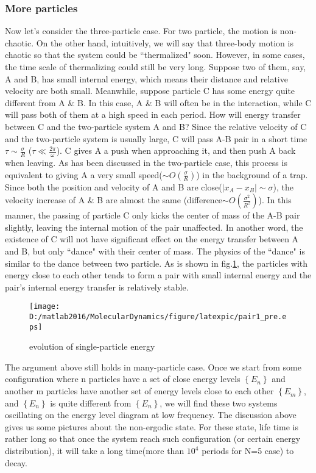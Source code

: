 \documentclass[aps,pre,twocolumn
,groupedaddress]{revtex4-1}
\begin{document}
\subsubsection{More particles}
Now let's consider the three-particle case. For two particle, the motion is non-chaotic. On the other hand, intuitively, we will say that three-body motion is chaotic so that the system could be ``thermalized" soon. However, in some cases, the time scale of thermalizing could still be very long. Suppose two of them, say, A and B, has small internal energy, which means their distance and relative velocity are both small. Meanwhile, suppose particle C has some energy quite different from A \& B. In this case, A \& B will often be in the interaction, while C will pass both of them at a high speed in each period. How will energy transfer between C and the two-particle system A and B? Since the relative velocity of C and the two-particle system is usually large, C will pass A-B pair in a short time $\tau\sim\frac{\sigma}{R}$ ($\tau\ll\frac{2\pi}{\omega}$). C gives A a push when approaching it, and then push A back when leaving.  As has been discussed in the two-particle case, this process is equivalent to giving A a very small speed($\sim O(\frac{\sigma}{R})$) in the background of a trap. Since both the position and velocity of A and B are close($|x_A-x_B|\sim\sigma$), the velocity increase of A \& B are almost the same (difference$\sim O(\frac{\sigma^2}{R^2})$). In this manner, the passing of particle C only kicks the center of mass of the A-B pair slightly, leaving the internal motion of the pair unaffected. In another word, the existence of C will not have significant effect on the energy transfer between A and B, but only ``dance" with their center of mass. The physics of the ``dance" is similar to the dance between two particle. As is shown in fig.\ref{fig:thermalization4}, the particles with energy close to each other tends to form a pair with small internal energy and the pair's internal energy transfer is relatively stable.

\begin{figure}
\centering
\texttt{[image: D:/matlab2016/MolecularDynamics/figure/latexpic/pair1\_pre.eps]}
\caption{evolution of single-particle energy}
\label{fig:thermalization4}
\end{figure}

The argument above still holds in many-particle case. Once we start from some configuration where n particles have a set of close energy levels $\left\lbrace E_n\right\rbrace $ and another m particles have another set of energy levels close to each other $\left\lbrace E_m\right\rbrace $, and $\left\lbrace E_n\right\rbrace $ is quite different from $\left\lbrace E_n\right\rbrace $, we will find these two systems oscillating on the energy level diagram at low frequency. 
The discussion above gives us some pictures about the non-ergodic state. For these state, life time is rather long so that once the system reach such configuration (or certain energy distribution), it will take a long time(more than $10^4$ periods for N=5 case) to decay. 
\end{document}
